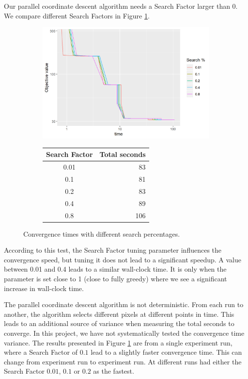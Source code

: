 Our parallel coordinate descent algorithm needs a Search Factor larger than 0. We compare different Search Factors in Figure \ref{pcdm:results:search}.

\begin{figure}[h]
	\centering
	\begin{subfigure}{0.6\linewidth}
		\includegraphics[width=1.0\linewidth]{./chapters/10.results/pcdm/searchPercent.png}
	\end{subfigure}
	\begin{subfigure}{0.35\linewidth}
		\begin{tabular}{c | r}
			Search Factor & Total seconds \\ \hline
			0.01 & 83 \\
			0.1 & 81 \\
			0.2 & 83 \\
			0.4 & 89 \\
			0.8 & 106 \\
		\end{tabular}
	\end{subfigure}
	\caption{Convergence times with different search percentages.}
	\label{pcdm:results:search}
\end{figure}

According to this test, the Search Factor tuning parameter influences the convergence speed, but tuning it does not lead to a significant speedup. A value between 0.01 and 0.4 leads to a similar wall-clock time. It is only when the parameter is set close to 1 (close to fully greedy) where we see a significant increase in wall-clock time.

The parallel coordinate descent algorithm is not deterministic. From each run to another, the algorithm selects different pixels at different points in time. This leads to an additional source of variance when measuring the total seconds to converge. In this project, we have not systematically tested the convergence time variance. The results presented in Figure \ref{pcdm:results:search} are from a single experiment run, where a Search Factor of $0.1$ lead to a slightly faster convergence time. This can change from experiment run to experiment run. At different runs had either the Search Factor $0.01$, $0.1$ or $0.2$ as the fastest.

